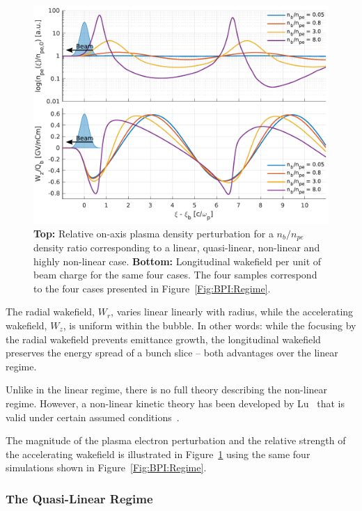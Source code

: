 \begin{figure}[hbt]
    \centering
    \includegraphics[width=0.875\linewidth,trim={0mm 0mm 0mm 0mm},clip]{figures/Density}
    \caption{\label{Fig:BPI:Density}
        \textbf{Top:} Relative on-axis plasma density perturbation for a $n_{b}/n_{pe}$ density ratio corresponding to a linear, quasi-linear, non-linear and highly non-linear case.
        \textbf{Bottom:} Longitudinal wakefield per unit of beam charge for the same four cases.
        The four samples correspond to the four cases presented in Figure~\ref{Fig:BPI:Regime}.
    }
\end{figure}

The radial wakefield, $W_{r}$, varies linear linearly with radius, while the accelerating wakefield, $W_{z}$, is uniform within the bubble.
In other words: while the focusing by the radial wakefield prevents emittance growth, the longitudinal wakefield preserves the energy spread of a bunch slice -- both advantages over the linear regime.

Unlike in the linear regime, there is no full theory describing the non-linear regime.
However, a non-linear kinetic theory has been developed by Lu \etal ~that is valid under certain assumed conditions~\cite{lu:2006a,lu:2006}.

The magnitude of the plasma electron perturbation and the relative strength of the accelerating wakefield is illustrated in Figure~\ref{Fig:BPI:Density} using the same four simulations shown in Figure~\ref{Fig:BPI:Regime}.

\subsubsection{The Quasi-Linear Regime}
\label{Int:BPI:QLin}

